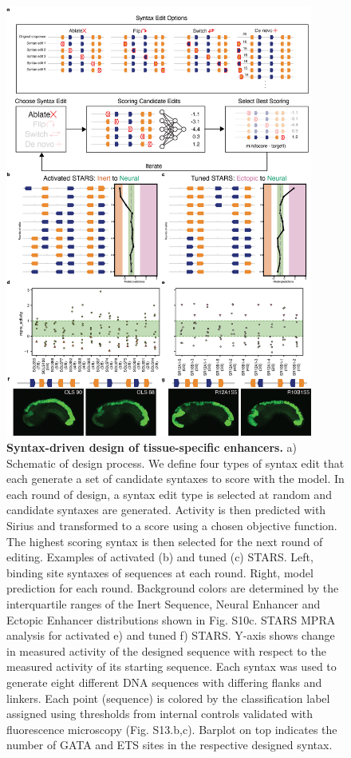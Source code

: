 \begin{figure}[p]
    \centering
    \includegraphics[width=0.9\textwidth, height=0.745\textheight]{2_figures-and-files/Fig4.png}
    \caption[Syntax-driven design of tissue-specific enhancers.]{\textbf{Syntax-driven design of tissue-specific enhancers.} a) Schematic of design process. We define four types of syntax edit that each generate a set of candidate syntaxes to score with the model. In each round of design, a syntax edit type is selected at random and candidate syntaxes are generated. Activity is then predicted with Sirius and transformed to a score using a chosen objective function. The highest scoring syntax is then selected for the next round of editing. Examples of activated (b) and tuned (c) STARS. Left, binding site syntaxes of sequences at each round. Right, model prediction for each round. Background colors are determined by the interquartile ranges of the Inert Sequence, Neural Enhancer and Ectopic Enhancer distributions shown in Fig. S10c. STARS MPRA analysis for activated e) and tuned f) STARS. Y-axis shows change in measured activity of the designed sequence with respect to the measured activity of its starting sequence. Each syntax was used to generate eight different DNA sequences with differing flanks and linkers. Each point (sequence) is colored by the classification label assigned using thresholds from internal controls validated with fluorescence microscopy (Fig. S13.b,c). Barplot on top indicates the number of GATA and ETS sites in the respective designed syntax.}
    \label{fig:2 Figure 4}
\end{figure}


